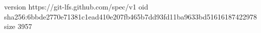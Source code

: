 version https://git-lfs.github.com/spec/v1
oid sha256:6bbde2770e71381c1ead410e207fb465b7dd93fd11ba9633bd51616187422978
size 3957
